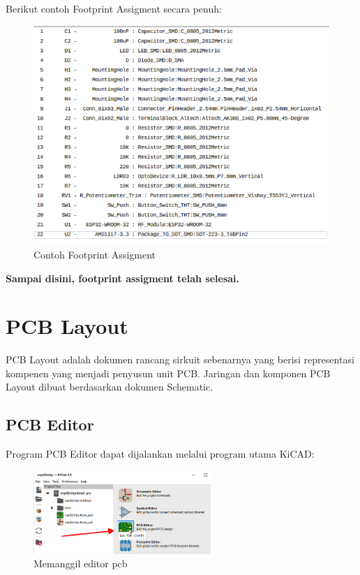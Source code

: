 \documentclass[12pt]{book}
\begin{document}
	Berikut contoh Footprint Assigment secara penuh:

	\begin{figure}[!ht]
		\centering
		\includegraphics[width=\textwidth]{images/fpa/fpa_full}
		\caption{Contoh Footprint Assigment}
	\end{figure}

	\begin{center}
		\textbf{Sampai disini, footprint assigment telah selesai.}
	\end{center}


	\newpage
	\chapter{PCB Layout}

	PCB Layout adalah dokumen rancang sirkuit sebenarnya yang berisi representasi kompenen
	yang menjadi penyusun unit PCB.
	Jaringan dan komponen PCB Layout dibuat berdasarkan dokumen Schematic.

	\section{PCB Editor}

	Program PCB Editor dapat dijalankan melalui program utama KiCAD:

	\begin{figure}[!ht]
		\centering
		\includegraphics[width=0.6\textwidth]{images/pcb/pcb_0}
		\caption{Memanggil editor pcb}
	\end{figure}
\end{document}
